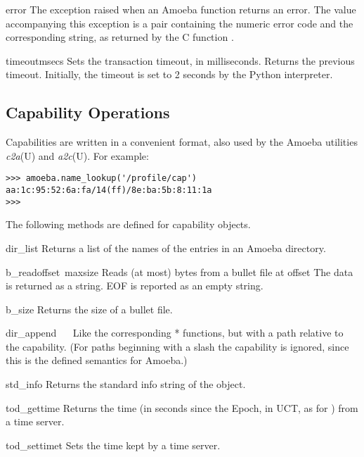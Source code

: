 \begin{excdesc}{error}
The exception raised when an Amoeba function returns an error.
The value accompanying this exception is a pair containing the numeric
error code and the corresponding string, as returned by the C function
.
\end{excdesc}

\begin{funcdesc}{timeout}{msecs}
Sets the transaction timeout, in milliseconds.
Returns the previous timeout.
Initially, the timeout is set to 2 seconds by the Python interpreter.
\end{funcdesc}

\subsection{Capability Operations}

Capabilities are written in a convenient \ASCII{} format, also used by the
Amoeba utilities
\emph{c2a}(U)
and
\emph{a2c}(U).
For example:

\begin{verbatim}
>>> amoeba.name_lookup('/profile/cap')
aa:1c:95:52:6a:fa/14(ff)/8e:ba:5b:8:11:1a
>>> 
\end{verbatim}
%
The following methods are defined for capability objects.

\begin{funcdesc}{dir_list}{}
Returns a list of the names of the entries in an Amoeba directory.
\end{funcdesc}

\begin{funcdesc}{b_read}{offset\, maxsize}
Reads (at most)
bytes from a bullet file at offset
The data is returned as a string.
EOF is reported as an empty string.
\end{funcdesc}

\begin{funcdesc}{b_size}{}
Returns the size of a bullet file.
\end{funcdesc}

\begin{funcdesc}{dir_append}{}
\ 
\ 
Like the corresponding
*
functions, but with a path relative to the capability.
(For paths beginning with a slash the capability is ignored, since this
is the defined semantics for Amoeba.)
\end{funcdesc}

\begin{funcdesc}{std_info}{}
Returns the standard info string of the object.
\end{funcdesc}

\begin{funcdesc}{tod_gettime}{}
Returns the time (in seconds since the Epoch, in UCT, as for \POSIX{}) from
a time server.
\end{funcdesc}

\begin{funcdesc}{tod_settime}{t}
Sets the time kept by a time server.
\end{funcdesc}
